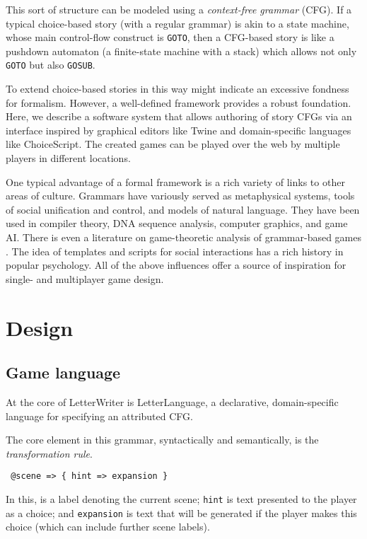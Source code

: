 \documentclass{acm_proc_article-sp}
\begin{document}
This sort of structure can be modeled using a {\em context-free grammar} (CFG).
If a typical choice-based story (with a regular grammar) is akin to a state machine,
 whose main control-flow construct is {\tt GOTO},
then a CFG-based story is like a pushdown automaton (a finite-state machine with a stack)
 which allows not only {\tt GOTO} but also {\tt GOSUB}.

To extend choice-based stories in this way might indicate an excessive fondness for formalism.
However, a well-defined framework provides a robust foundation.
Here, we describe a software system that allows authoring of story CFGs
via an interface inspired by graphical editors like Twine and domain-specific languages like ChoiceScript.
The created games can be played over the web by multiple players in different locations.

One typical advantage of a formal framework is a rich variety of links to other areas of culture.
Grammars have variously served as metaphysical systems\cite{SanskritSutras,Priscian},
tools of social unification and control\cite{AcademieFrancaise,RobertLowth},
and models of natural language\cite{Chomsky}.
They have been used in compiler theory\cite{AhoLamSethiUllmanCompilersDragonBook},
DNA sequence analysis\cite{Durbin98},
computer graphics\cite{LSystems}, and game AI\cite{Sims3}.
There is even a literature on game-theoretic analysis of grammar-based games
\cite{DBLP:conf/icalp/EtessamiWY08}.
The idea of templates and scripts for social interactions has a rich history in popular psychology\cite{EricBerneGamesPeoplePlay,EricBerneWhatDoYouSayAfterYouSayHello}.
All of the above influences offer a source of inspiration for single- and multiplayer game design.

\section{Design}

\subsection{Game language}

At the core of LetterWriter is LetterLanguage,
a declarative, domain-specific language for specifying an attributed CFG.

The core element in this grammar, syntactically and semantically, is the {\em transformation rule}.
\begin{verbatim}
 @scene => { hint => expansion }
\end{verbatim}
In this, {\tt \@scene} is a label denoting the current scene;
{\tt hint} is text presented to the player as a choice;
and {\tt expansion} is text that will be generated if the player makes this choice
(which can include further scene labels).
\end{document}
